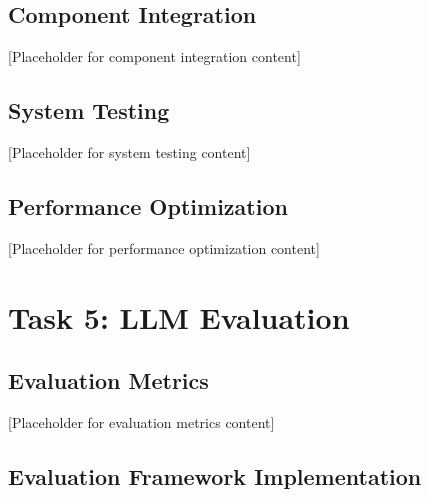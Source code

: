 \documentclass[12pt,a4paper]{article}
\begin{document}
\subsection{Component Integration}


[Placeholder for component integration content]

\subsection{System Testing}


[Placeholder for system testing content]

\subsection{Performance Optimization}


[Placeholder for performance optimization content]

\section{Task 5: LLM Evaluation}


\subsection{Evaluation Metrics}


[Placeholder for evaluation metrics content]

\subsection{Evaluation Framework Implementation}
\end{document}
